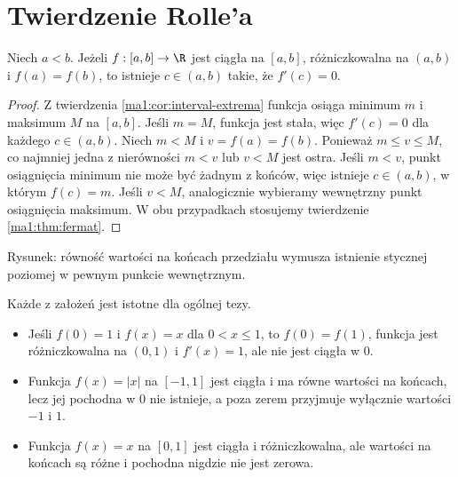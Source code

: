 \section{Twierdzenie Rolle'a}
\begin{twierdzenie}[Rolle'a]
\label{ma1:thm:rolle}
Niech $a<b$. Jeżeli $f:[a,b]\to\R$ jest ciągła na $[a,b]$, różniczkowalna na $(a,b)$ i $f(a)=f(b)$, to istnieje $c\in(a,b)$ takie, że $f'(c)=0$.
\end{twierdzenie}
\begin{proof}
Z twierdzenia \ref{ma1:cor:interval-extrema} funkcja osiąga minimum $m$ i maksimum $M$ na $[a,b]$. Jeśli $m=M$, funkcja jest stała, więc $f'(c)=0$ dla każdego $c\in(a,b)$. Niech $m<M$ i $v=f(a)=f(b)$. Ponieważ $m\le v\le M$, co najmniej jedna z nierówności $m<v$ lub $v<M$ jest ostra. Jeśli $m<v$, punkt osiągnięcia minimum nie może być żadnym z końców, więc istnieje $c\in(a,b)$, w którym $f(c)=m$. Jeśli $v<M$, analogicznie wybieramy wewnętrzny punkt osiągnięcia maksimum. W obu przypadkach stosujemy twierdzenie \ref{ma1:thm:fermat}.
\end{proof}
\begin{center}

\small Rysunek: równość wartości na końcach przedziału wymusza istnienie stycznej poziomej w pewnym punkcie wewnętrznym.
\end{center}
\begin{przyklad}
\label{ma1:ex:rolle-assumptions}
Każde z założeń jest istotne dla ogólnej tezy.
\begin{itemize}
 \item Jeśli $f(0)=1$ i $f(x)=x$ dla $0<x\le1$, to $f(0)=f(1)$, funkcja jest różniczkowalna na $(0,1)$ i $f'(x)=1$, ale nie jest ciągła w $0$.
 \item Funkcja $f(x)=|x|$ na $[-1,1]$ jest ciągła i ma równe wartości na końcach, lecz jej pochodna w $0$ nie istnieje, a poza zerem przyjmuje wyłącznie wartości $-1$ i $1$.
 \item Funkcja $f(x)=x$ na $[0,1]$ jest ciągła i różniczkowalna, ale wartości na końcach są różne i pochodna nigdzie nie jest zerowa.
\end{itemize}
\end{przyklad}

